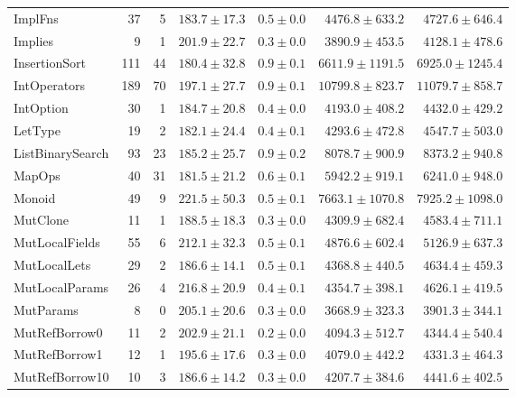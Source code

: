 \begin{table}
\begin{tabular}{lrrrrrr}
ImplFns                  &   37 &    5 &     $183.7\pm17.3$ &  $0.5\pm0.0$ &   $4476.8\pm633.2$ &   $4727.6\pm646.4$ \\
Implies                  &    9 &    1 &     $201.9\pm22.7$ &  $0.3\pm0.0$ &   $3890.9\pm453.5$ &   $4128.1\pm478.6$ \\
InsertionSort            &  111 &   44 &     $180.4\pm32.8$ &  $0.9\pm0.1$ &  $6611.9\pm1191.5$ &  $6925.0\pm1245.4$ \\
IntOperators             &  189 &   70 &     $197.1\pm27.7$ &  $0.9\pm0.1$ &  $10799.8\pm823.7$ &  $11079.7\pm858.7$ \\
IntOption                &   30 &    1 &     $184.7\pm20.8$ &  $0.4\pm0.0$ &   $4193.0\pm408.2$ &   $4432.0\pm429.2$ \\
LetType                  &   19 &    2 &     $182.1\pm24.4$ &  $0.4\pm0.1$ &   $4293.6\pm472.8$ &   $4547.7\pm503.0$ \\
ListBinarySearch         &   93 &   23 &     $185.2\pm25.7$ &  $0.9\pm0.2$ &   $8078.7\pm900.9$ &   $8373.2\pm940.8$ \\
MapOps                   &   40 &   31 &     $181.5\pm21.2$ &  $0.6\pm0.1$ &   $5942.2\pm919.1$ &   $6241.0\pm948.0$ \\
Monoid                   &   49 &    9 &     $221.5\pm50.3$ &  $0.5\pm0.1$ &  $7663.1\pm1070.8$ &  $7925.2\pm1098.0$ \\
MutClone                 &   11 &    1 &     $188.5\pm18.3$ &  $0.3\pm0.0$ &   $4309.9\pm682.4$ &   $4583.4\pm711.1$ \\
MutLocalFields           &   55 &    6 &     $212.1\pm32.3$ &  $0.5\pm0.1$ &   $4876.6\pm602.4$ &   $5126.9\pm637.3$ \\
MutLocalLets             &   29 &    2 &     $186.6\pm14.1$ &  $0.5\pm0.1$ &   $4368.8\pm440.5$ &   $4634.4\pm459.3$ \\
MutLocalParams           &   26 &    4 &     $216.8\pm20.9$ &  $0.4\pm0.1$ &   $4354.7\pm398.1$ &   $4626.1\pm419.5$ \\
MutParams                &    8 &    0 &     $205.1\pm20.6$ &  $0.3\pm0.0$ &   $3668.9\pm323.3$ &   $3901.3\pm344.1$ \\
MutRefBorrow0            &   11 &    2 &     $202.9\pm21.1$ &  $0.2\pm0.0$ &   $4094.3\pm512.7$ &   $4344.4\pm540.4$ \\
MutRefBorrow1            &   12 &    1 &     $195.6\pm17.6$ &  $0.3\pm0.0$ &   $4079.0\pm442.2$ &   $4331.3\pm464.3$ \\
MutRefBorrow10           &   10 &    3 &     $186.6\pm14.2$ &  $0.3\pm0.0$ &   $4207.7\pm384.6$ &   $4441.6\pm402.5$ \\

\end{tabular}
\end{table}
